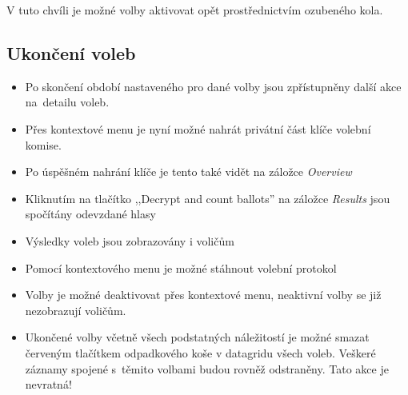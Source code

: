V tuto chvíli je možné volby aktivovat opět prostřednictvím ozubeného kola.

\subsection*{Ukončení voleb}

\begin{itemize}
	\item Po skončení období nastaveného pro dané volby jsou zpřístupněny další akce na~detailu voleb.
	\item Přes kontextové menu je nyní možné nahrát privátní část klíče volební komise.
	\item Po úspěšném nahrání klíče je tento také vidět na záložce \textit{Overview} 
	\item Kliknutím na tlačítko ,,Decrypt and count ballots'' na záložce \textit{Results} \;jsou spočítány odevzdané hlasy
	\item Výsledky voleb jsou zobrazovány i voličům
	\item Pomocí kontextového menu je možné stáhnout volební protokol
	\item Volby je možné deaktivovat přes kontextové menu, neaktivní volby se již nezobrazují voličům.
	\item Ukončené volby včetně všech podstatných náležitostí je možné smazat červeným tlačítkem odpadkového koše v datagridu všech voleb. Veškeré záznamy spojené s~těmito volbami budou rovněž odstraněny. Tato akce je nevratná!
\end{itemize}


